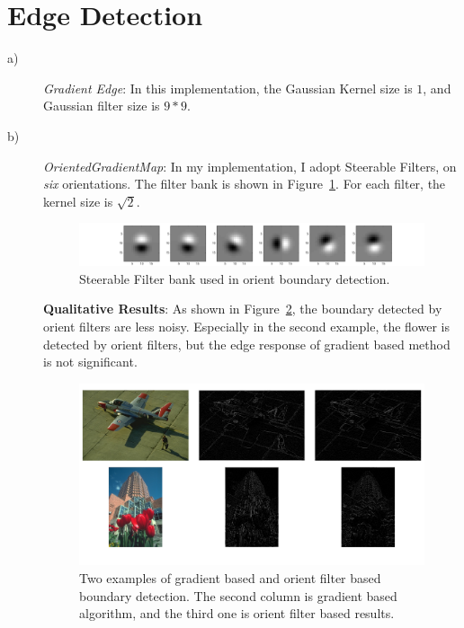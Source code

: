 \documentclass[11pt]{article}
\begin{document}
\section{Edge Detection}
\begin{description}
\item[a)] \emph{Gradient Edge}: In this implementation, the Gaussian Kernel size is $1$, and Gaussian filter size is $9*9$.

\item[b)] \emph{OrientedGradientMap}: In my implementation, I adopt Steerable Filters, on \emph{six} orientations. The filter bank is shown in Figure~\ref{fig:filter_bank}. For each filter, the kernel size is $\sqrt{2}$.

\begin{figure}[h]
\centering
\includegraphics[width=0.95\linewidth]{./img/steerablefilters.png}
\caption{Steerable Filter bank used in orient boundary detection.}
\label{fig:filter_bank}
\end{figure}

\textbf{Qualitative Results}: As shown in Figure~\ref{fig:examples}, the boundary detected by orient filters are less noisy. Especially in the second example, the flower is detected by orient filters, but the edge response of gradient based method is not significant. 

\begin{figure}[h]
\centering
\includegraphics[width=\linewidth]{./img/examples.png}
\caption{Two examples of gradient based and orient filter based boundary detection. The second column is gradient based algorithm, and the third one is orient filter based results.}
\label{fig:examples}
\end{figure}


\end{description}
\end{document}
